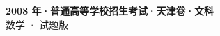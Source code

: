 \documentclass[zihao=-4, a4paper]{ctexart}
\begin{document}
\begin{center}
  {\Large\bfseries 2008 年·普通高等学校招生考试·天津卷·文科}\\[4pt]
  {\large 数学 · 试题版}
\end{center}
\medskip
{}

\end{document}
